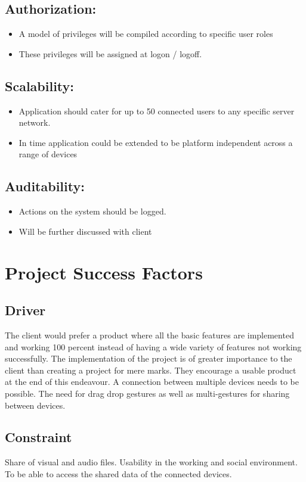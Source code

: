 \documentclass[12pt]{article}
\begin{document}
\subsection{Authorization:}
	\begin{itemize}
	\item A model of privileges will be compiled according to specific user roles
	\item These privileges will be assigned at logon / logoff.
	\end{itemize}

\subsection{Scalability:}
	\begin{itemize}
	\item Application should cater for up to 50 connected users to any specific server network.
	\item In time application could be extended to be platform independent across a range of devices
	\end{itemize}

\subsection{Auditability:}
	\begin{itemize}
	\item Actions on the system should be logged.
	\item Will be further discussed with client
	\end{itemize}

\section{Project Success Factors}
\subsection{Driver}
	The client would prefer a product where all the basic features are implemented and working 100 percent instead of having a wide variety of features not working successfully. The implementation of the project is of greater importance to the client than creating a project for mere marks. They encourage a usable product at the end of this endeavour. A connection between multiple 		devices needs to be possible. The need for drag drop gestures as well as multi-gestures for sharing between devices.
\subsection{Constraint}
	Share of visual and audio files. Usability in the working and social environment. To be able to access the shared data of the connected devices.
\end{document}
